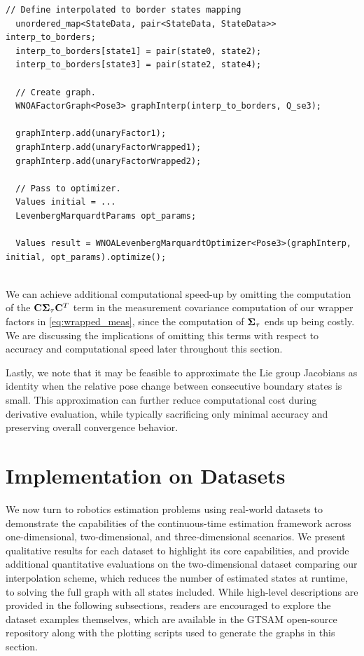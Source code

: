 \begin{lstlisting}[style=C++Style, label={lst:interp_wnoa}, caption={Constructing an interpolated WNOA factor graph.}]
  // Define interpolated to border states mapping
  unordered_map<StateData, pair<StateData, StateData>> interp_to_borders;
  interp_to_borders[state1] = pair(state0, state2);
  interp_to_borders[state3] = pair(state2, state4);
	
  // Create graph.
  WNOAFactorGraph<Pose3> graphInterp(interp_to_borders, Q_se3);
	
  graphInterp.add(unaryFactor1);
  graphInterp.add(unaryFactorWrapped1);
  graphInterp.add(unaryFactorWrapped2);
	
  // Pass to optimizer.
  Values initial = ...
  LevenbergMarquardtParams opt_params;
	
  Values result = WNOALevenbergMarquardtOptimizer<Pose3>(graphInterp, initial, opt_params).optimize();
	
\end{lstlisting}

We can achieve additional computational speed-up by omitting the computation of the $\mathbf{C} \mathbf{\Sigma}_{\tau} \mathbf{C}^T$ term in the measurement covariance computation of our wrapper factors in  \eqref{eq:wrapped_meas}, since the computation of $\mathbf{\Sigma}_{\tau}$ ends up being costly.
We are discussing the implications of omitting this terms with respect to accuracy and computational speed later throughout this section.

Lastly, we note that it may be feasible to approximate the Lie group Jacobians as identity when the relative pose change between consecutive boundary states is small.
This approximation can further reduce computational cost during derivative evaluation, while typically sacrificing only minimal accuracy and preserving overall convergence behavior.

\section{Implementation on Datasets}

We now turn to robotics estimation problems using real-world datasets to demonstrate the capabilities of the continuous-time estimation framework across one-dimensional, two-dimensional, and three-dimensional scenarios.
We present qualitative results for each dataset to highlight its core capabilities, and provide additional quantitative evaluations on the two-dimensional dataset comparing our interpolation scheme, which reduces the number of estimated states at runtime, to solving the full graph with all states included.
While high-level descriptions are provided in the following subsections, readers are encouraged to explore the dataset examples themselves, which are available in the GTSAM open-source repository along with the plotting scripts used to generate the graphs in this section.

